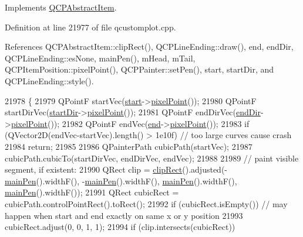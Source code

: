 Implements \hyperlink{class_q_c_p_abstract_item_ad0dc056f650c3ca73414e6b4f01674ef}{Q\+C\+P\+Abstract\+Item}.



Definition at line 21977 of file qcustomplot.\+cpp.



References Q\+C\+P\+Abstract\+Item\+::clip\+Rect(), Q\+C\+P\+Line\+Ending\+::draw(), end, end\+Dir, Q\+C\+P\+Line\+Ending\+::es\+None, main\+Pen(), m\+Head, m\+Tail, Q\+C\+P\+Item\+Position\+::pixel\+Point(), Q\+C\+P\+Painter\+::set\+Pen(), start, start\+Dir, and Q\+C\+P\+Line\+Ending\+::style().


\begin{DoxyCode}
21978 \{
21979   QPointF startVec(\hyperlink{class_q_c_p_item_curve_a20c3b5ea31c33764f4f30c2ec7ae518b}{start}->\hyperlink{class_q_c_p_item_position_ae490f9c76ee2ba33752c495d3b6e8fb5}{pixelPoint}());
21980   QPointF startDirVec(\hyperlink{class_q_c_p_item_curve_aa124bf66c09cc51c627fb49db8bf8a7b}{startDir}->\hyperlink{class_q_c_p_item_position_ae490f9c76ee2ba33752c495d3b6e8fb5}{pixelPoint}());
21981   QPointF endDirVec(\hyperlink{class_q_c_p_item_curve_a28181a9dee9cc3c3da83a883221bd2d0}{endDir}->\hyperlink{class_q_c_p_item_position_ae490f9c76ee2ba33752c495d3b6e8fb5}{pixelPoint}());
21982   QPointF endVec(\hyperlink{class_q_c_p_item_curve_a24ecbb195b32a08b42b61c2cf08a1b4d}{end}->\hyperlink{class_q_c_p_item_position_ae490f9c76ee2ba33752c495d3b6e8fb5}{pixelPoint}());
21983   \textcolor{keywordflow}{if} (QVector2D(endVec-startVec).length() > 1e10f) \textcolor{comment}{// too large curves cause crash}
21984     \textcolor{keywordflow}{return};
21985 
21986   QPainterPath cubicPath(startVec);
21987   cubicPath.cubicTo(startDirVec, endDirVec, endVec);
21988 
21989   \textcolor{comment}{// paint visible segment, if existent:}
21990   QRect clip = \hyperlink{class_q_c_p_abstract_item_a538e25ff8856534582f5b2b400a46405}{clipRect}().adjusted(-\hyperlink{class_q_c_p_item_curve_a8089126f5645b6edfbaddea49d1e8390}{mainPen}().widthF(), -\hyperlink{class_q_c_p_item_curve_a8089126f5645b6edfbaddea49d1e8390}{mainPen}().widthF(), 
      \hyperlink{class_q_c_p_item_curve_a8089126f5645b6edfbaddea49d1e8390}{mainPen}().widthF(), \hyperlink{class_q_c_p_item_curve_a8089126f5645b6edfbaddea49d1e8390}{mainPen}().widthF());
21991   QRect cubicRect = cubicPath.controlPointRect().toRect();
21992   \textcolor{keywordflow}{if} (cubicRect.isEmpty()) \textcolor{comment}{// may happen when start and end exactly on same x or y position}
21993     cubicRect.adjust(0, 0, 1, 1);
21994   \textcolor{keywordflow}{if} (clip.intersects(cubicRect))

\end{DoxyCode}
